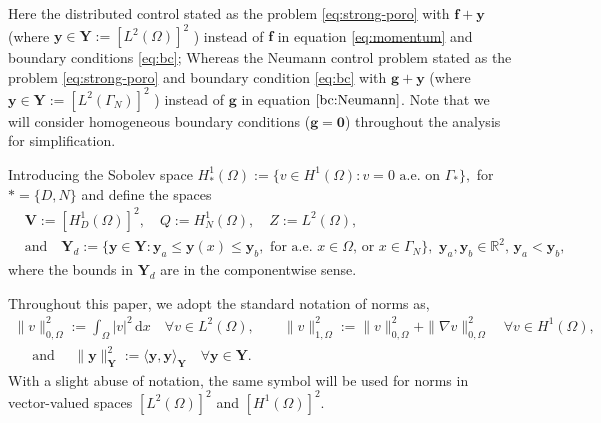 \documentclass[smallextended]{svjour3}
\numberwithin{equation}{section}
\numberwithin{figure}{section}
\numberwithin{table}{section}
\newcommand\cero{{\boldsymbol{0}}}
\newcommand\bV{\mathbf{V}}
\newcommand\ff{\boldsymbol{f}}
\newcommand\bg{\boldsymbol{g}}
\newcommand\by{\boldsymbol{y}}
\newcommand\bv{\boldsymbol{v}}
\newcommand{\bYd}{\boldsymbol{Y}_d}
\newcommand{\bY}{\boldsymbol{Y}}
\newcommand{\bbR}{\mathbb{R}}
\newcommand{\dx}{\,\mathrm{d}x}
\begin{document}
	Here the distributed control stated as the problem \eqref{eq:strong-poro} with $\ff+ \by$ (where $\by \in \bY:= [L^2(\Omega)]^2$ ) instead of $\ff$ in equation \eqref{eq:momentum} and boundary conditions \eqref{eq:bc}; Whereas the Neumann control problem stated as the problem \eqref{eq:strong-poro} and boundary condition \eqref{eq:bc} with $\bg +\by$ (where $\by \in \bY:= [L^2(\Gamma_N)]^2$ ) instead of $\bg$ in equation $\eqref{bc:Neumann}$. Note that we will consider homogeneous boundary conditions ($\bg=\cero$) throughout the analysis for simplification.
	
	Introducing the Sobolev space
	$H^1_*(\Omega):= \{ v \in H^1(\Omega): v =0 \text{ a.e. on } \Gamma_*\},$ for $*=\{D,N\}$ and define the spaces
	\begin{align*}
		&\bV := [H^1_D(\Omega)]^2, \quad Q := H^1_N(\Omega), \quad Z:= L^2(\Omega), \\
		&\text{and} \quad \bYd:= \{ \by \in \bY: \by_a \le \by(x) \le \by_b, \text{ for a.e. } x \in \Omega \text{, or } x \in\Gamma_N\}, \,\,  \by_a, \by_b \in \bbR^2, \,\by_a< \by_b,
	\end{align*}
	where the bounds in $\bYd$ are in the componentwise sense.

    \noindent Throughout this paper, we adopt the standard notation of norms as, 
    \begin{gather*}
        \|v\|_{0, \Omega}^2 := \int_{\Omega} |v|^2 \dx \quad \forall v \in L^2(\Omega), \qquad \| v\|_{1, \Omega}^2:= \|v\|_{0, \Omega}^2 + \| \nabla v\|_{0, \Omega}^2 \quad \forall v \in H^1(\Omega), \\
        \quad \text{ and } \quad
        \| \by\|_{\bY}^2:= \langle \by, \by \rangle_{\bY} \quad \forall \by \in \bY.
    \end{gather*}
    With a slight abuse of notation, the same symbol will be used for norms in vector-valued spaces $[L^2(\Omega)]^2$ and  $[H^1(\Omega)]^2$.
    
	
\end{document}
